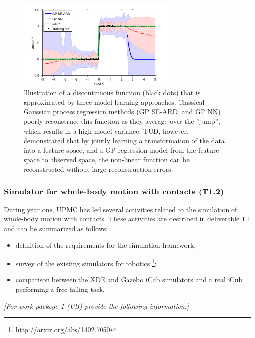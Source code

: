 \documentclass[12pt,a4paper,twoside]{article}
\begin{document}
\begin{figure}
\centering
\includegraphics[width=0.7\textwidth]{./images/AAAI2014_0.pdf}
 \caption{Illustration of a discontinuous function (black dots) that is approximated by three 
 model learning approaches. Classical Gaussian process regression methods (GP SE-ARD, and GP NN) 
 poorly reconstruct this function as they average over the ``jump'', which results in a high model variance. 
 TUD, however, demonstrated that by jointly learning a transformation of the data into a feature space, 
 and a GP regression model from the feature space to observed space, the non-linear function 
 can be reconstructed without large reconstruction errors. 
}
\label{fig:example_discontinuities}
\end{figure}

\subsubsection{Simulator for whole-body motion with contacts (T1.2)}

During year one, UPMC has led several activities related to the simulation of whole-body motion with contacts. These activities are described in deliverable 1.1 and can be summarized as follows:
\begin{itemize}
	\item definition of the requirements for the simulation framework;
	\item survey of the existing simulators for robotics \footnote{http://arxiv.org/abs/1402.7050};
	\item comparison between the XDE and Gazebo iCub simulators and a real iCub performing a free-falling task.
\end{itemize}

\emph{\color{red}[For work package 1 (UB) provide the following information:]}
\end{document}
